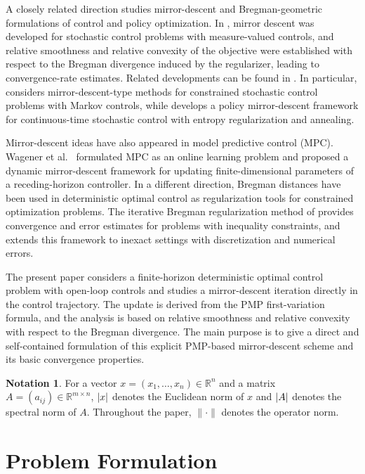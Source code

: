 \documentclass[11pt]{amsart}
\theoremstyle{plain}
\theoremstyle{definition}
\newtheorem*{notation}{Notation}
\theoremstyle{remark}
\DeclarePairedDelimiter{\abs}{\lvert}{\rvert}
\begin{document}
A closely related direction studies mirror-descent and Bregman-geometric formulations of control and policy optimization. In \cite{kerimkulov2025mirror}, mirror descent was developed for stochastic control problems with measure-valued controls, and relative smoothness and relative convexity of the objective were established with respect to the Bregman divergence induced by the regularizer, leading to convergence-rate estimates. Related developments can be found in \cite{sethi2025mirror,sethi2025entropy}. In particular, \cite{sethi2025mirror} considers mirror-descent-type methods for constrained stochastic control problems with Markov controls, while \cite{sethi2025entropy} develops a policy mirror-descent framework for continuous-time stochastic control with entropy regularization and annealing.

Mirror-descent ideas have also appeared in model predictive control (MPC). Wagener et al.~\cite{wagener2019online} formulated MPC as an online learning problem and proposed a dynamic mirror-descent framework for updating finite-dimensional parameters of a receding-horizon controller. In a different direction, Bregman distances have been used in deterministic optimal control as regularization tools for constrained optimization problems. The iterative Bregman regularization method of \cite{porner2016iterative} provides convergence and error estimates for problems with inequality constraints, and \cite{porner2018inexact} extends this framework to inexact settings with discretization and numerical errors.

The present paper considers a finite-horizon deterministic optimal control problem with open-loop controls and studies a mirror-descent iteration directly in the control trajectory. The update is derived from the PMP first-variation formula, and the analysis is based on relative smoothness and relative convexity with respect to the Bregman divergence. The main purpose is to give a direct and self-contained formulation of this explicit PMP-based mirror-descent scheme and its basic convergence properties.

\begin{notation}
    For a vector $x = (x_1, \ldots, x_n) \in \mathbb{R}^n$ and a matrix $A = (a_{ij}) \in \mathbb{R}^{m \times n}$, $\abs{x}$ denotes the Euclidean norm of $x$ and $\abs{A}$ denotes the spectral norm of $A$. Throughout the paper, $\|\cdot\|$ denotes the operator norm.
\end{notation}

\section{Problem Formulation}\label{sec:formulation}
\end{document}
